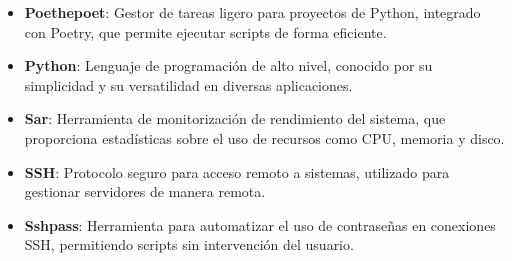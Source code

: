 \begin{itemize}
    \item \textbf{Poethepoet}\cite{poe}: Gestor de tareas ligero para proyectos de Python, integrado con Poetry, que permite ejecutar scripts de forma eficiente.
    \item \textbf{Python}\cite{python}: Lenguaje de programación de alto nivel, conocido por su simplicidad y su versatilidad en diversas aplicaciones.
    \item \textbf{Sar}\cite{sar}: Herramienta de monitorización de rendimiento del sistema, que proporciona estadísticas sobre el uso de recursos como CPU, memoria y disco.
    \item \textbf{SSH}\cite{ssh}: Protocolo seguro para acceso remoto a sistemas, utilizado para gestionar servidores de manera remota.
    \item \textbf{Sshpass}\cite{sshpass}: Herramienta para automatizar el uso de contraseñas en conexiones SSH, permitiendo scripts sin intervención del usuario.
\end{itemize}
